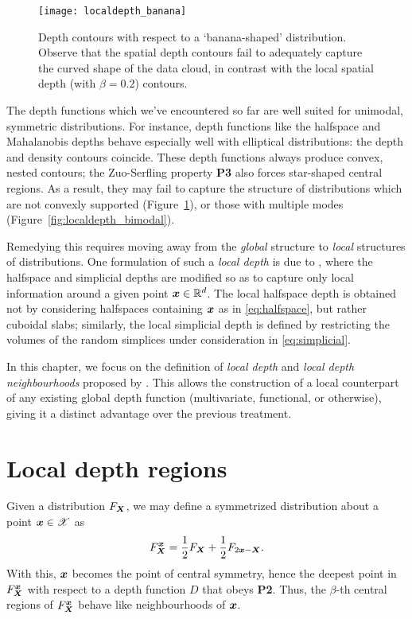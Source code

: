 

\begin{figure}
    \centering
    \texttt{[image: localdepth\_banana]}
    \caption{
        Depth contours with respect to a `banana-shaped' distribution.
        Observe that the spatial depth contours fail to adequately capture the
        curved shape of the data cloud, in contrast with the local spatial
        depth (with $\beta = 0.2$) contours.
    }
    \label{fig:localdepth_banana}
\end{figure}


The depth functions which we've encountered so far are well suited for
unimodal, symmetric distributions.
For instance, depth functions like the halfspace and Mahalanobis depths behave
especially well with elliptical distributions: the depth and density contours
coincide.
These depth functions always produce convex, nested contours; the Zuo-Serfling
property \textbf{P3} also forces star-shaped central regions.
As a result, they may fail to capture the structure of distributions which are
not convexly supported (Figure~\ref{fig:localdepth_banana}), or those with
multiple modes (Figure~\ref{fig:localdepth_bimodal}).

Remedying this requires moving away from the \emph{global} structure to
\emph{local} structures of distributions.
One formulation of such a \emph{local depth} is due to
\textcite{agostinelli-romanazzi-2011}, where the halfspace and simplicial
depths are modified so as to capture only local information around a given
point $\bm{x} \in \mathbb{R}^d$.
The local halfspace depth is obtained not by considering halfspaces containing
$\bm{x}$ as in \ref{eq:halfspace}, but rather cuboidal slabs; similarly, the
local simplicial depth is defined by restricting the volumes of the random
simplices under consideration in \ref{eq:simplicial}.

In this chapter, we focus on the definition of \emph{local depth} and
\emph{local depth neighbourhoods} proposed by
\textcite{paindaveine-bever-2013}.
This allows the construction of a local counterpart of any existing global
depth function (multivariate, functional, or otherwise), giving it a distinct
advantage over the previous treatment.



\section{Local depth regions}

Given a distribution $F_{\bm{X}}$, we may define a symmetrized distribution about
a point $\bm{x} \in \mathscr{X}$ as
\begin{equation}
    F^{\bm{x}}_{\bm{X}} = \frac{1}{2}F_{\bm{X}} + \frac{1}{2}F_{2\bm{x} - \bm{X}}. \label{eq:local_symmetrization}
\end{equation}
With this, $\bm{x}$ becomes the point of central symmetry, hence the deepest
point in $F^{\bm{x}}_{\bm{X}}$ with respect to a depth function $D$ that obeys
\textbf{P2}.
Thus, the $\beta$-th central regions of $F^{\bm{x}}_{\bm{X}}$ behave like
neighbourhoods of $\bm{x}$.

